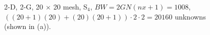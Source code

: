\documentclass[final,3p,times,11pt]{elsarticle}
\begin{document}
% 
    \begin{figure}[ht]
      \centering
      \caption{2-D, 2-G, 20 $\times$ 20 mesh, S$_4$, $BW=2GN(nx+1)=1008$, $((20+1)(20)+(20)(20+1))\cdot2\cdot2=20160$ unknowns (shown in (a)).}
      \label{fig:two_d_matx_full}
    \end{figure}
\end{document}

